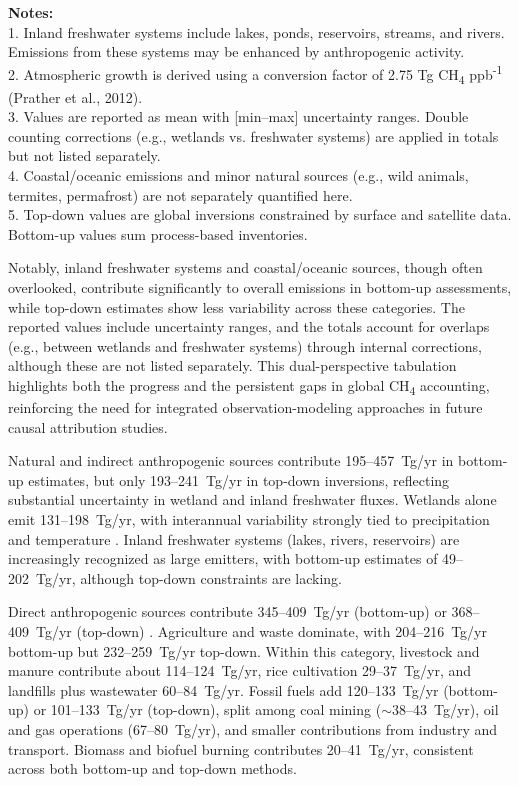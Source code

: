 \vspace{-1.5em}
\begin{flushleft}
	{\footnotesize
		\textbf{Notes:} \\
		1. Inland freshwater systems include lakes, ponds, reservoirs, streams, and rivers. Emissions from these systems may be enhanced by anthropogenic activity.\\
		2. Atmospheric growth is derived using a conversion factor of 2.75 Tg CH\textsubscript{4} ppb\textsuperscript{-1} (Prather et al., 2012).\\
		3. Values are reported as mean with [min--max] uncertainty ranges. Double counting corrections (e.g., wetlands vs. freshwater systems) are applied in totals but not listed separately.\\
		4. Coastal/oceanic emissions and minor natural sources (e.g., wild animals, termites, permafrost) are not separately quantified here.\\
		5. Top-down values are global inversions constrained by surface and satellite data. Bottom-up values sum process-based inventories.
	}
\end{flushleft}

Notably, inland freshwater systems and coastal/oceanic sources, though often overlooked, contribute significantly to overall emissions in bottom-up assessments, while top-down estimates show less variability across these categories. The reported values include uncertainty ranges, and the totals account for overlaps (e.g., between wetlands and freshwater systems) through internal corrections, although these are not listed separately. This dual-perspective tabulation highlights both the progress and the persistent gaps in global CH\textsubscript{4} accounting, reinforcing the need for integrated observation-modeling approaches in future causal attribution studies.

Natural and indirect anthropogenic sources contribute 195--457~Tg/yr in bottom-up estimates, but only 193--241~Tg/yr in top-down inversions, reflecting substantial uncertainty in wetland and inland freshwater fluxes. Wetlands alone emit 131--198~Tg/yr, with interannual variability strongly tied to precipitation and temperature \cite{Pandey2017, Knox2024}. Inland freshwater systems (lakes, rivers, reservoirs) are increasingly recognized as large emitters, with bottom-up estimates of 49--202~Tg/yr, although top-down constraints are lacking.

Direct anthropogenic sources contribute 345--409~Tg/yr (bottom-up) or 368--409~Tg/yr (top-down) \cite{global_methane_budget}. Agriculture and waste dominate, with 204--216~Tg/yr bottom-up but 232--259~Tg/yr top-down. Within this category, livestock and manure contribute about 114--124~Tg/yr, rice cultivation 29--37~Tg/yr, and landfills plus wastewater 60--84~Tg/yr. Fossil fuels add 120--133~Tg/yr (bottom-up) or 101--133~Tg/yr (top-down), split among coal mining ($\sim$38--43~Tg/yr), oil and gas operations (67--80~Tg/yr), and smaller contributions from industry and transport. Biomass and biofuel burning contributes 20--41~Tg/yr, consistent across both bottom-up and top-down methods.

